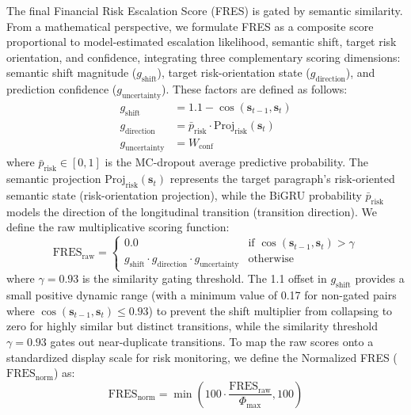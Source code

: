 \documentclass[journal]{IEEEtran}
\begin{document}
The final Financial Risk Escalation Score (FRES) is gated by semantic similarity. From a mathematical perspective, we formulate FRES as a composite score proportional to model-estimated escalation likelihood, semantic shift, target risk orientation, and confidence, integrating three complementary scoring dimensions: semantic shift magnitude ($g_{\text{shift}}$), target risk-orientation state ($g_{\text{direction}}$), and prediction confidence ($g_{\text{uncertainty}}$). These factors are defined as follows:
\begin{align}
g_{\text{shift}} &= 1.1 - \cos(\mathbf{s}_{t-1}, \mathbf{s}_t) \\
g_{\text{direction}} &= \bar{p}_{\text{risk}} \cdot \text{Proj}_{\text{risk}}(\mathbf{s}_t) \\
g_{\text{uncertainty}} &= W_{\text{conf}}
\end{align}
where $\bar{p}_{\text{risk}} \in [0, 1]$ is the MC-dropout average predictive probability. The semantic projection $\text{Proj}_{\text{risk}}(\mathbf{s}_t)$ represents the target paragraph's risk-oriented semantic state (risk-orientation projection), while the BiGRU probability $\bar{p}_{\text{risk}}$ models the direction of the longitudinal transition (transition direction). We define the raw multiplicative scoring function:
\begin{equation}
\text{FRES}_{\text{raw}} = \begin{cases} 
0.0 & \text{if } \cos(\mathbf{s}_{t-1}, \mathbf{s}_t) > \gamma \\
g_{\text{shift}} \cdot g_{\text{direction}} \cdot g_{\text{uncertainty}} & \text{otherwise}
\end{cases}
\end{equation}
where $\gamma = 0.93$ is the similarity gating threshold. The 1.1 offset in $g_{\text{shift}}$ provides a small positive dynamic range (with a minimum value of 0.17 for non-gated pairs where $\cos(\mathbf{s}_{t-1}, \mathbf{s}_t) \le 0.93$) to prevent the shift multiplier from collapsing to zero for highly similar but distinct transitions, while the similarity threshold $\gamma = 0.93$ gates out near-duplicate transitions. To map the raw scores onto a standardized display scale for risk monitoring, we define the Normalized FRES ($\text{FRES}_{\text{norm}}$) as:
\begin{equation}
\text{FRES}_{\text{norm}} = \min\left(100 \cdot \frac{\text{FRES}_{\text{raw}}}{\Phi_{\text{max}}}, 100\right)
\end{equation}
\end{document}
